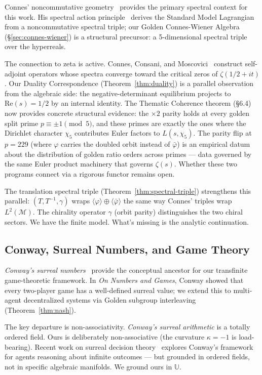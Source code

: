 \documentclass[12pt,oneside]{article}
\theoremstyle{principia}
\theoremstyle{definition}
\theoremstyle{remark}
\providecommand{\UU}{\mathbb{U}}
\providecommand{\vp}{\varphi}
\providecommand{\vpbar}{\bar{\varphi}}
\providecommand{\kap}{\kappa}
\begin{document}
Connes' noncommutative geometry~\cite{connes} provides the primary spectral context for this work. His spectral action principle~\cite{connes-marcolli} derives the Standard Model Lagrangian from a noncommutative spectral triple; our Golden Connes-Wiener Algebra (\S\ref{sec:connes-wiener}) is a structural precursor: a 5-dimensional spectral triple over the hyperreals.

The connection to zeta is active. Connes, Consani, and Moscovici~\cite{connes-consani-zeta} construct self-adjoint operators whose spectra converge toward the critical zeros of $\zeta(1/2 + it)$. Our Duality Correspondence (Theorem~\ref{thm:duality}) is a parallel observation from the algebraic side: the negative-determinant equilibrium projects to $\mathrm{Re}(s) = 1/2$ by an internal identity. The Thematic Coherence theorem (\S6.4) now provides concrete structural evidence: the $\times 2$ parity holds at every golden split prime $p \equiv \pm 1 \pmod{5}$, and these primes are exactly the ones where the Dirichlet character $\chi_5$ contributes Euler factors to $L(s, \chi_5)$. The parity flip at $p = 229$ (where $\vp$ carries the doubled orbit instead of $\vpbar$) is an empirical datum about the distribution of golden ratio orders across primes --- data governed by the same Euler product machinery that governs $\zeta(s)$. Whether these two programs connect via a rigorous functor remains open.

The translation spectral triple (Theorem~\ref{thm:spectral-triple}) strengthens this parallel: $(T, T^{-1}, \gamma)$ wraps $\langle\vp\rangle \oplus \langle\vpbar\rangle$ the same way Connes' triples wrap $L^2(\mathcal{M})$. The chirality operator $\gamma$ (orbit parity) distinguishes the two chiral sectors. We have the finite model. What's missing is the analytic continuation.

\subsection*{Conway, Surreal Numbers, and Game Theory}

\emph{Conway's surreal numbers}~\cite{conway,knuth-surreal} provide the conceptual ancestor for our transfinite game-theoretic framework. In \emph{On Numbers and Games}, Conway showed that every two-player game has a well-defined surreal value; we extend this to multi-agent decentralized systems via Golden subgroup interleaving (Theorem~\ref{thm:nash}).

The key departure is non-associativity. \emph{Conway's surreal arithmetic} is a totally ordered field. Ours is deliberately non-associative (the curvature $\kap = -1$ is load-bearing). Recent work on surreal decision theory~\cite{bostrom-surreal} explores Conway's framework for agents reasoning about infinite outcomes --- but grounded in ordered fields, not in specific algebraic manifolds. We ground ours in $\UU$.
\end{document}
